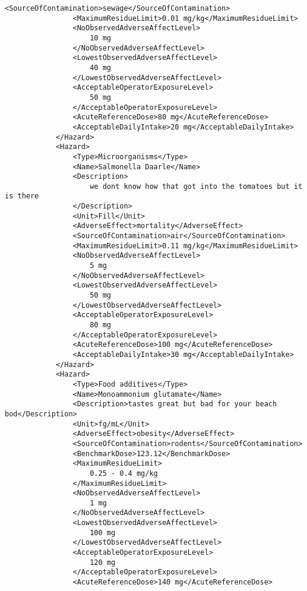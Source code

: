 \documentclass[a4paper]{report}
\begin{document}
\begin{lstlisting}[language=RAKIP, caption={Example of StudySample}]
                <SourceOfContamination>sewage</SourceOfContamination>
                <MaximumResidueLimit>0.01 mg/kg</MaximumResidueLimit>
                <NoObservedAdverseAffectLevel>
                    10 mg
                </NoObservedAdverseAffectLevel>
                <LowestObservedAdverseAffectLevel>
                    40 mg
                </LowestObservedAdverseAffectLevel>
                <AcceptableOperatorExposureLevel>
                    50 mg
                </AcceptableOperatorExposureLevel>
                <AcuteReferenceDose>80 mg</AcuteReferenceDose>
                <AcceptableDailyIntake>20 mg</AcceptableDailyIntake>
            </Hazard>
            <Hazard>
                <Type>Microorganisms</Type>
                <Name>Salmonella Daarle</Name>
                <Description>
                    we dont know how that got into the tomatoes but it is there
                </Description>
                <Unit>Fill</Unit>
                <AdverseEffect>mortality</AdverseEffect>
                <SourceOfContamination>air</SourceOfContamination>
                <MaximumResidueLimit>0.11 mg/kg</MaximumResidueLimit>
                <NoObservedAdverseAffectLevel>
                    5 mg
                </NoObservedAdverseAffectLevel>
                <LowestObservedAdverseAffectLevel>
                    50 mg
                </LowestObservedAdverseAffectLevel>
                <AcceptableOperatorExposureLevel>
                    80 mg
                </AcceptableOperatorExposureLevel>
                <AcuteReferenceDose>100 mg</AcuteReferenceDose>
                <AcceptableDailyIntake>30 mg</AcceptableDailyIntake>
            </Hazard>
            <Hazard>
                <Type>Food additives</Type>
                <Name>Monoammonium glutamate</Name>
                <Description>tastes great but bad for your beach bod</Description>
                <Unit>fg/mL</Unit>
                <AdverseEffect>obesity</AdverseEffect>
                <SourceOfContamination>rodents</SourceOfContamination>
                <BenchmarkDose>123.12</BenchmarkDose>
                <MaximumResidueLimit>
                    0.25 - 0.4 mg/kg
                </MaximumResidueLimit>
                <NoObservedAdverseAffectLevel>
                    1 mg
                </NoObservedAdverseAffectLevel>
                <LowestObservedAdverseAffectLevel>
                    100 mg
                </LowestObservedAdverseAffectLevel>
                <AcceptableOperatorExposureLevel>
                    120 mg
                </AcceptableOperatorExposureLevel>
                <AcuteReferenceDose>140 mg</AcuteReferenceDose>

\end{lstlisting}
\end{document}
